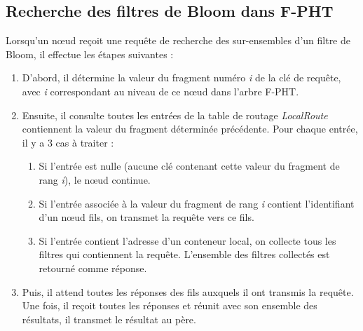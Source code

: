 \documentclass[a4paper,11pt]{report}
\begin{document}
\subsection{Recherche des filtres de Bloom dans F-PHT}
	Lorsqu'un nœud reçoit une requête de recherche des sur-ensembles d'un filtre de Bloom, il effectue les étapes suivantes :
	\begin{enumerate}
		\item D'abord, il détermine la valeur du fragment numéro \textit{i} de la clé de requête, avec \textit{i} correspondant au niveau de ce nœud dans l'arbre F-PHT.
		\item Ensuite, il consulte toutes les entrées de la table de routage \textit{LocalRoute} contiennent la valeur du fragment déterminée précédente. Pour chaque entrée, il y a 3 cas à traiter :
		\begin{enumerate}
			\item Si l'entrée est nulle (aucune clé contenant cette valeur du fragment de rang \textit{i}), le nœud continue.
			\item Si l'entrée associée à la valeur du fragment de rang \textit{i} contient l'identifiant d'un nœud fils, on transmet la requête vers ce fils.
			\item Si l'entrée contient l'adresse d'un conteneur local, on collecte tous les filtres qui contiennent la requête. L'ensemble des filtres collectés est retourné comme réponse.
		\end{enumerate}
		\item Puis, il attend toutes les réponses des fils auxquels il ont transmis la requête. Une fois, il reçoit toutes les réponses et réunit avec son ensemble des résultats, il transmet le résultat au père.
	\end{enumerate}
	
\end{document}
